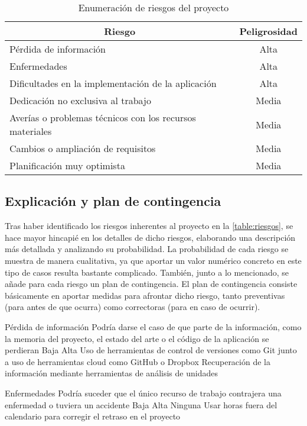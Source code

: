 \begin{table}[H]
	\centering
	\begin{tabular}{ |l|c| } 
		\hline
		\multicolumn{1}{|c|}{Riesgo} & 
		\multicolumn{1}{|c|}{Peligrosidad} \\
		\hline
			Pérdida de información										& Alta	\\
			Enfermedades												& Alta	\\
			Dificultades en la implementación de la aplicación			& Alta	\\
			Dedicación no exclusiva al trabajo							& Media	\\
			Averías o problemas técnicos con los recursos materiales	& Media	\\
			Cambios o ampliación de requisitos							& Media	\\
			Planificación muy optimista									& Media	\\
		\hline
	\end{tabular}
	\caption{Enumeración de riesgos del proyecto}
	\label{table:riesgos}
\end{table}


\subsection{Explicación y plan de contingencia}
Tras haber identificado los riesgos inherentes al proyecto en la \autoref{table:riesgos}, se hace mayor hincapié en los detalles de dicho riesgos, elaborando una descripción más detallada y analizando su probabilidad. La probabilidad de cada riesgo se muestra de manera cualitativa, ya que aportar un valor numérico concreto en este tipo de casos resulta bastante complicado. También, junto a lo mencionado, se añade para cada riesgo un plan de contingencia. El plan de contingencia consiste básicamente en aportar medidas para afrontar dicho riesgo, tanto preventivas (para antes de que ocurra) como correctoras (para en caso de ocurrir).

\riskframe
	{Pérdida de información}
	{Podría darse el caso de que parte de la información, como la memoria del proyecto, el estado del arte o el código de la aplicación se perdieran}
	{Baja}
	{Alta}
	{Uso de herramientas de control de versiones como Git junto a uso de herramientas cloud como GitHub o Dropbox}
	{Recuperación de la información mediante herramientas de análisis de unidades}

\riskframe
	{Enfermedades}
	{Podría suceder que el único recurso de trabajo contrajera una enfermedad o tuviera un accidente}
	{Baja}
	{Alta}
	{Ninguna}
	{Usar horas fuera del calendario para corregir el retraso en el proyecto}


